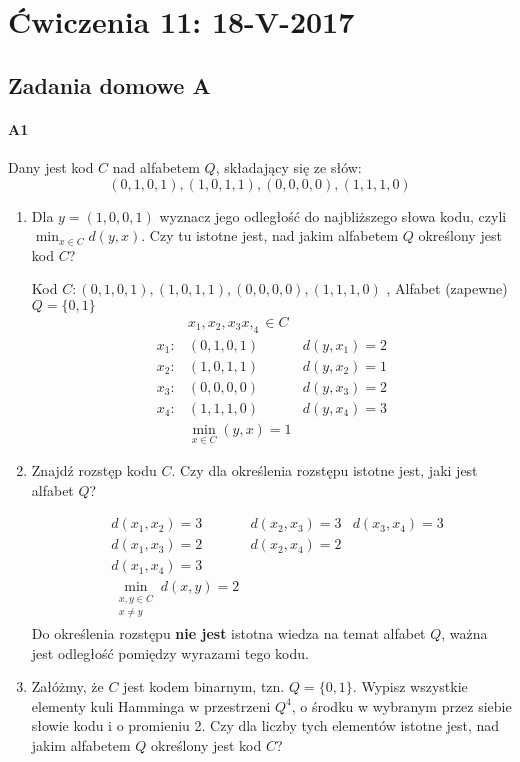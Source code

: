 \section{Ćwiczenia 11: 18-V-2017}
\subsection{Zadania domowe A}
\paragraph{A1} Dany jest kod $C$ nad alfabetem $Q$, składający się ze słów:
$$(0, 1, 0, 1), (1, 0, 1, 1), (0, 0, 0, 0), (1, 1, 1, 0)$$
\begin{enumerate}[label=\alph*)]
\item Dla $y = (1, 0, 0, 1)$ wyznacz jego odległość do najbliższego słowa kodu, czyli $\min _{x \in C} d(y, x)$. Czy tu istotne jest, nad jakim alfabetem $Q$ określony jest kod $C$?

Kod $C: (0, 1, 0, 1), (1, 0, 1, 1), (0, 0, 0, 0), (1, 1, 1, 0)$ , Alfabet (zapewne) $Q=\{0,1\} $
\begin{align*}
&x_1,x_2,x_3x,_4\in C\\
x_1: &(0, 1, 0, 1) & d(y,x_1)=2\\
x_2: &(1, 0, 1, 1) & d(y,x_2)=1\\
x_3: &(0, 0, 0, 0) & d(y,x_3)=2\\
x_4: &(1, 1, 1, 0) & d(y,x_4)=3\\
&\min _{x\in C}(y,x)=1
\end{align*}
\item Znajdź rozstęp kodu $C$. Czy dla określenia rozstępu istotne jest, jaki jest alfabet $Q$?

\begin{align*}
&d(x_1,x_2)=3&d(x_2,x_3)=3&d(x_3,x_4)=3\\
&d(x_1,x_3)=2&d(x_2,x_4)=2\\
&d(x_1,x_4)=3\\
&\min _{\begin{matrix}
x,y\in C\\
x\neq y
\end{matrix}} d(x,y)=2
\end{align*}
Do określenia rozstępu \textbf{nie jest} istotna wiedza na temat alfabet $Q$, ważna jest odległość pomiędzy wyrazami tego kodu.
\item Załóżmy, że $C$ jest kodem binarnym, tzn. $Q = \{0, 1\}$. Wypisz wszystkie elementy kuli Hamminga w przestrzeni $Q^4$, o środku w wybranym przez siebie słowie kodu i o promieniu 2. Czy dla liczby tych elementów istotne jest, nad jakim alfabetem $Q$ określony jest kod $C$?


\end{enumerate}
